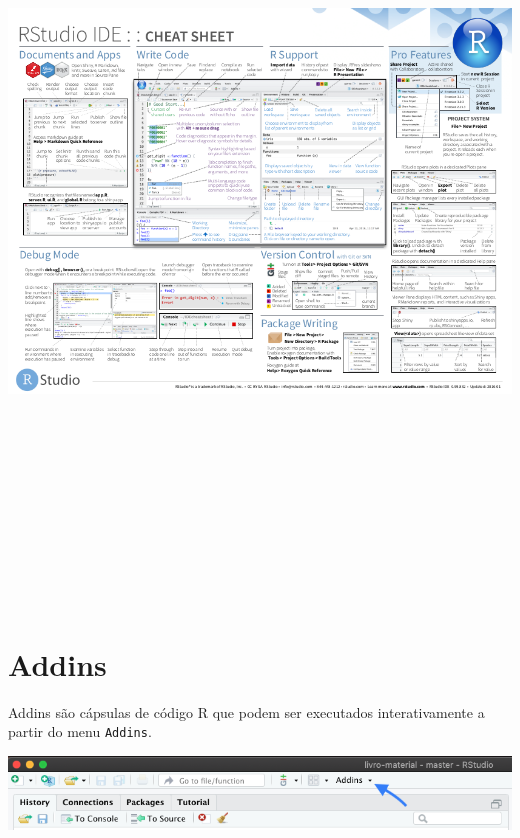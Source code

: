 \documentclass[
]{book}
\begin{document}
\begin{center}\includegraphics[width=700pt,height=600pt]{assets/img/rstudio/cheatsheet-rstudio} \end{center}

\hypertarget{addins}{%
\section{Addins}\label{addins}}

Addins são cápsulas de código R que podem ser executados interativamente a partir do menu \texttt{Addins}.

\begin{center}\includegraphics[width=0.7\linewidth]{assets/img/rstudio/botao_addins} \end{center}
\end{document}
